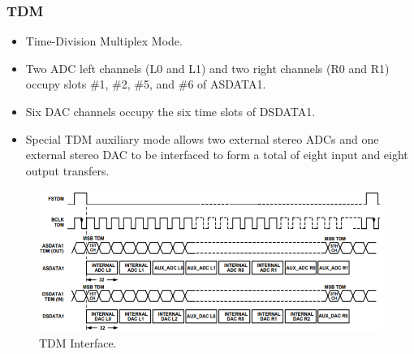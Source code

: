 \subsubsection{TDM}
\begin{itemize}
	\item Time-Division Multiplex Mode.
	\item Two ADC left channels (L0 and L1) and two right channels (R0 and R1) occupy slots \#1, \#2, \#5, and \#6 of ASDATA1.
	\item Six DAC channels occupy the six time slots of DSDATA1.
	\item Special TDM auxiliary mode allows	two external stereo ADCs and one external stereo DAC to be interfaced to form a total of eight input and eight output transfers.
\end{itemize}

\begin{figure} [H]
	\centering
	\includegraphics[width=\linewidth]{graphics/20.png}
	\caption{TDM Interface.}
	\label{fig:20}
\end{figure}

